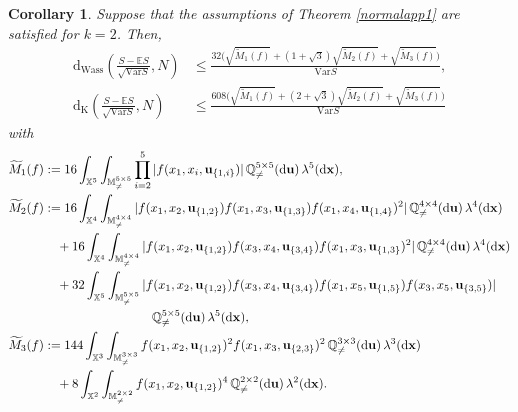\documentclass{article}
\newtheorem{corollary}[theorem]{Corollary}
\theoremstyle{definition}
\numberwithin{equation}{section}
\theoremstyle{remark}
\newcommand{\E}{\mathbb{E}}
\newcommand{\Var}{\mathrm{Var}}
\begin{document}
\begin{corollary}\label{normalapp1k2}
Suppose that the assumptions of Theorem \ref{normalapp1} are satisfied for $k=2$. Then,
\begin{align*}
	\mathrm{d}_{\mathrm{Wass}}\left(\frac{S-\E S}{\sqrt{\Var S}},N\right) & \le \frac{32 \Big(\sqrt{\widetilde{M}_1(f)} + (1+\sqrt{3}) \sqrt{\widetilde{M}_2(f)} + \sqrt{\widetilde{M}_3(f)}\Big)}{\Var S},\\
	\mathrm{d}_{\mathrm{K}}\left(\frac{S-\E S}{\sqrt{\Var S}},N\right) & \le \frac{608 \Big(\sqrt{\widetilde{M}_1(f)} + (2+\sqrt{3}) \sqrt{\widetilde{M}_2(f)} + \sqrt{\widetilde{M}_3(f)}\Big)}{\Var S}
\end{align*}
with
\begin{align*}
\widetilde{M}_{1}(f) & := 16\int_{\mathbb{X}^5} \int_{\mathbb{M}_{\neq}^{5\times 5}} \prod_{i=2}^5 |f(x_1,x_i,\mathbf{u}_{\{1,i\}})| \, \mathbb{Q}_{\neq}^{5\times 5}(\mathrm{d}\mathbf{u}) \, \lambda^5(\mathrm{d}\mathbf{x}), \allowdisplaybreaks \\
\widetilde{M}_{2}(f) & := 16\int_{\mathbb{X}^4} \int_{\mathbb{M}_{\neq}^{4\times 4}} |f(x_1,x_2,\mathbf{u}_{\{1,2\}}) f(x_1,x_3,\mathbf{u}_{\{1,3\}}) f(x_1,x_4,\mathbf{u}_{\{1,4\}})^2| \, \mathbb{Q}_{\neq}^{4\times 4}(\mathrm{d}\mathbf{u}) \, \lambda^4(\mathrm{d}\mathbf{x}) \\
& \quad +16\int_{\mathbb{X}^4} \int_{\mathbb{M}_{\neq}^{4\times 4}} |f(x_1,x_2,\mathbf{u}_{\{1,2\}}) f(x_3,x_4,\mathbf{u}_{\{3,4\}}) f(x_1,x_3,\mathbf{u}_{\{1,3\}})^2| \, \mathbb{Q}_{\neq}^{4\times 4}(\mathrm{d}\mathbf{u}) \, \lambda^4(\mathrm{d}\mathbf{x}) \\
& \quad +32\int_{\mathbb{X}^5} \int_{\mathbb{M}_{\neq}^{5\times 5}} |f(x_1,x_2,\mathbf{u}_{\{1,2\}}) f(x_3,x_4,\mathbf{u}_{\{3,4\}}) f(x_1,x_5,\mathbf{u}_{\{1,5\}})  f(x_3,x_5,\mathbf{u}_{\{3,5\}})| \\
& \hspace{3cm} \mathbb{Q}_{\neq}^{5\times 5}(\mathrm{d}\mathbf{u}) \, \lambda^5(\mathrm{d}\mathbf{x}), \allowdisplaybreaks\\
\widetilde{M}_{3}(f) & := 144 \int_{\mathbb{X}^3} \int_{\mathbb{M}_{\neq}^{3\times 3}} f(x_1,x_2,\mathbf{u}_{\{1,2\}})^2 f(x_1,x_3,\mathbf{u}_{\{2,3\}})^2 \, \mathbb{Q}_{\neq}^{3\times 3}(\mathrm{d}\mathbf{u}) \, \lambda^3(\mathrm{d}\mathbf{x}) \\
& \quad + 8 \int_{\mathbb{X}^2} \int_{\mathbb{M}_{\neq}^{2\times 2}} f(x_1,x_2,\mathbf{u}_{\{1,2\}})^4 \, \mathbb{Q}_{\neq}^{2\times 2}(\mathrm{d}\mathbf{u}) \, \lambda^2(\mathrm{d}\mathbf{x}).
\end{align*}
\end{corollary}
\end{document}
